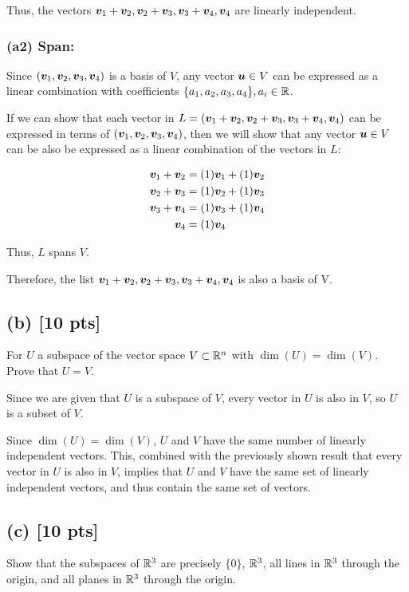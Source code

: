 \documentclass[twoside,10pt]{article}
\newcommand{\aln}[1]{\begin{align}#1\end{align}}
\begin{document}
Thus, the vectors $\bm{v}_1 + \bm{v}_2, \bm{v}_2 + \bm{v}_3, \bm{v}_3 + \bm{v}_4, \bm{v}_4$ are linearly independent.\\

\subsubsection*{(a2) Span:}

Since $(\bm{v}_1, \bm{v}_2, \bm{v}_3, \bm{v}_4)$ is a basis of $V$, any vector $\bm{u} \in V$ can be expressed as a linear combination with coefficients $\{a_1, a_2, a_3, a_4\}, a_i \in \mathbb{R}$.

If we can show that each vector in $L = (\bm{v}_1 + \bm{v}_2, \bm{v}_2 + \bm{v}_3, \bm{v}_3 + \bm{v}_4, \bm{v}_4)$ can be expressed in terms of $(\bm{v}_1, \bm{v}_2, \bm{v}_3, \bm{v}_4)$, then we will show that any vector $\bm{u} \in V$ can be also be expressed as a linear combination of the vectors in $L$:

\aln{
\vct{v}_1 + \vct{v}_2 &= (1)\vct{v}_1 + (1)\vct{v}_2\\
\vct{v}_2 + \vct{v}_3 &= (1)\vct{v}_2 + (1)\vct{v}_3\\
\vct{v}_3 + \vct{v}_4 &= (1)\vct{v}_3 + (1)\vct{v}_4\\
\vct{v}_4 &= (1)\vct{v}_4
}

Thus, $L$ spans $V$.

Therefore, the list $\bm{v}_1 + \bm{v}_2, \bm{v}_2 + \bm{v}_3, \bm{v}_3 + \bm{v}_4, \bm{v}_4$ is also a basis of V.

\subsection*{(b) [10 pts]}
For $U$ a subspace of the vector space $V \subset \mathbb{R}^n$ with $\dim(U) = \dim(V)$. Prove that $U = V$.

Since we are given that $U$ is a subspace of $V$, every vector in $U$ is also in $V$, so $U$ is a subset of $V$.

Since $\dim(U) = \dim(V)$, $U$ and $V$ have the same number of linearly independent vectors.
This, combined with the previously shown result that every vector in $U$ is also in $V$, implies that $U$ and $V$ have the same set of linearly independent vectors, and thus contain the same set of vectors.

\subsection*{(c) [10 pts]}
Show that the subspaces of $\mathbb{R}^3$ are precisely $\{0\}$, $\mathbb{R}^{3}$, all lines in $\mathbb{R}^3$ through the origin, and all planes in $\mathbb{R}^3$ through the origin.
\end{document}
